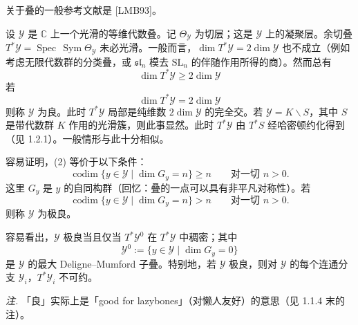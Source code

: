 


关于叠的一般参考文献是 [LMB93]。

 设 $\mathcal{Y}$ 是 $\mathbb{C}$ 上一个光滑的等维代数叠。记 $\Theta_{\mathcal{Y}}$ 为切层；这是 $\mathcal{Y}$ 上的凝聚层。余切叠 $T^{*}\mathcal{Y}=\operatorname{Spec}\,\operatorname{Sym}\Theta_{\mathcal{Y}}$ 未必光滑。一般而言，$\dim T^{*}\mathcal{Y}=2\dim\mathcal{Y}$ 也不成立（例如考虑无限代数群的分类叠，或 $\mathfrak{sl}_n$ 模去 $\mathrm{SL}_n$ 的伴随作用所得的商）。然而总有
\begin{equation}\tag{1}
\dim T^{*}\mathcal{Y}\ge 2\dim\mathcal{Y}
\end{equation}
若
\begin{equation}\tag{2}
\dim T^{*}\mathcal{Y}=2\dim\mathcal{Y}
\end{equation}
则称 $\mathcal{Y}$ 为良。此时 $T^{*}\mathcal{Y}$ 局部是纯维数 $2\dim\mathcal{Y}$ 的完全交。若 $\mathcal{Y}=K\backslash S$，其中 $S$ 是带代数群 $K$ 作用的光滑簇，则此事显然。此时 $T^{*}\mathcal{Y}$ 由 $T^{*}S$ 经哈密顿约化得到（见 1.2.1）。一般情形与此十分相似。

容易证明，(2) 等价于以下条件：
\begin{equation}\tag{3}
\operatorname{codim}\{y\in\mathcal{Y}\mid \dim G_y=n\}\ge n\qquad\text{对一切 }n>0.
\end{equation}
这里 $G_y$ 是 $y$ 的自同构群（回忆：叠的一点可以具有非平凡对称性）。若
\begin{equation}\tag{4}
\operatorname{codim}\{y\in\mathcal{Y}\mid \dim G_y=n\}>n\qquad\text{对一切 }n>0.
\end{equation}
则称 $\mathcal{Y}$ 为极良。

容易看出，$\mathcal{Y}$ 极良当且仅当 $T^{*}\mathcal{Y}^{0}$ 在 $T^{*}\mathcal{Y}$ 中稠密；其中
\[
\mathcal{Y}^{0}:=\{y\in\mathcal{Y}\mid \dim G_y=0\}
\]
是 $\mathcal{Y}$ 的最大 Deligne--Mumford 子叠。特别地，若 $\mathcal{Y}$ 极良，则对 $\mathcal{Y}$ 的每个连通分支 $\mathcal{Y}_i$，$T^{*}\mathcal{Y}_i$ 不可约。

\emph{注.} 「良」实际上是「good for lazybones」（对懒人友好）的意思（见 1.1.4 末的注）。

